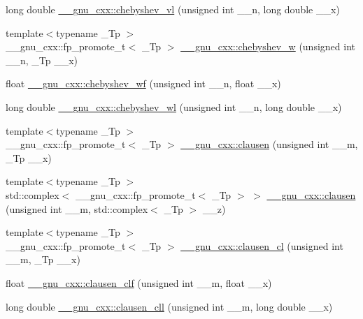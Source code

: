 \begin{DoxyCompactItemize}
\item 
long double \hyperlink{group__gnu__math__spec__func_gae387ee1bfcd52555ad4d690f5888a078}{\+\_\+\+\_\+gnu\+\_\+cxx\+::chebyshev\+\_\+vl} (unsigned int \+\_\+\+\_\+n, long double \+\_\+\+\_\+x)
\item 
{\footnotesize template$<$typename \+\_\+\+Tp $>$ }\\\+\_\+\+\_\+gnu\+\_\+cxx\+::fp\+\_\+promote\+\_\+t$<$ \+\_\+\+Tp $>$ \hyperlink{group__gnu__math__spec__func_gaa156c6c21e99104ebcb627e92aceada0}{\+\_\+\+\_\+gnu\+\_\+cxx\+::chebyshev\+\_\+w} (unsigned int \+\_\+\+\_\+n, \+\_\+\+Tp \+\_\+\+\_\+x)
\item 
float \hyperlink{group__gnu__math__spec__func_gae6d468cee53df584e40afe294127b090}{\+\_\+\+\_\+gnu\+\_\+cxx\+::chebyshev\+\_\+wf} (unsigned int \+\_\+\+\_\+n, float \+\_\+\+\_\+x)
\item 
long double \hyperlink{group__gnu__math__spec__func_ga1297dfd9b9a0f584435de7d83eb9e9c3}{\+\_\+\+\_\+gnu\+\_\+cxx\+::chebyshev\+\_\+wl} (unsigned int \+\_\+\+\_\+n, long double \+\_\+\+\_\+x)
\item 
{\footnotesize template$<$typename \+\_\+\+Tp $>$ }\\\+\_\+\+\_\+gnu\+\_\+cxx\+::fp\+\_\+promote\+\_\+t$<$ \+\_\+\+Tp $>$ \hyperlink{group__gnu__math__spec__func_ga54e4ba71b1f81718d6998349f91ff88f}{\+\_\+\+\_\+gnu\+\_\+cxx\+::clausen} (unsigned int \+\_\+\+\_\+m, \+\_\+\+Tp \+\_\+\+\_\+x)
\item 
{\footnotesize template$<$typename \+\_\+\+Tp $>$ }\\std\+::complex$<$ \+\_\+\+\_\+gnu\+\_\+cxx\+::fp\+\_\+promote\+\_\+t$<$ \+\_\+\+Tp $>$ $>$ \hyperlink{group__gnu__math__spec__func_gaf7c4317ef6bfd3a4bf0ddcba22ee7588}{\+\_\+\+\_\+gnu\+\_\+cxx\+::clausen} (unsigned int \+\_\+\+\_\+m, std\+::complex$<$ \+\_\+\+Tp $>$ \+\_\+\+\_\+z)
\item 
{\footnotesize template$<$typename \+\_\+\+Tp $>$ }\\\+\_\+\+\_\+gnu\+\_\+cxx\+::fp\+\_\+promote\+\_\+t$<$ \+\_\+\+Tp $>$ \hyperlink{group__gnu__math__spec__func_ga8786b86db309998f93f877cfb9bdfd57}{\+\_\+\+\_\+gnu\+\_\+cxx\+::clausen\+\_\+cl} (unsigned int \+\_\+\+\_\+m, \+\_\+\+Tp \+\_\+\+\_\+x)
\item 
float \hyperlink{group__gnu__math__spec__func_ga5e1bf6c24eb4359ffacb49da62f0838b}{\+\_\+\+\_\+gnu\+\_\+cxx\+::clausen\+\_\+clf} (unsigned int \+\_\+\+\_\+m, float \+\_\+\+\_\+x)
\item 
long double \hyperlink{group__gnu__math__spec__func_gab06f3c94f96538167147f028711903a9}{\+\_\+\+\_\+gnu\+\_\+cxx\+::clausen\+\_\+cll} (unsigned int \+\_\+\+\_\+m, long double \+\_\+\+\_\+x)

\end{DoxyCompactItemize}
